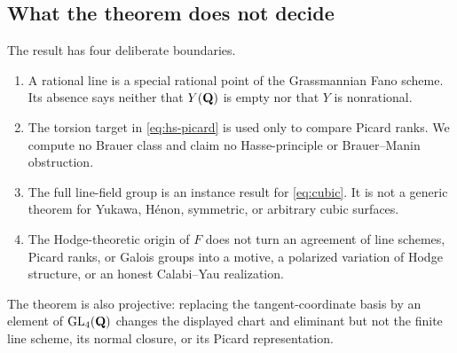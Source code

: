 \subsection{What the theorem does not decide}

The result has four deliberate boundaries.
\begin{enumerate}[leftmargin=*]
\item A rational line is a special rational point of the Grassmannian Fano
scheme.  Its absence says neither that \(Y(\mathbf Q)\) is empty nor that \(Y\) is
nonrational.
\item The torsion target in \cref{eq:hs-picard} is used only to compare
Picard ranks.  We compute no Brauer class and claim no Hasse-principle or
Brauer--Manin obstruction.
\item The full line-field group is an instance result for
\cref{eq:cubic}.  It is not a generic theorem for Yukawa, H\'enon,
symmetric, or arbitrary cubic surfaces.
\item The Hodge-theoretic origin of \(F\) does not turn an agreement of
line schemes, Picard ranks, or Galois groups into a motive, a polarized
variation of Hodge structure, or an honest Calabi--Yau realization.
\end{enumerate}

The theorem is also projective: replacing the tangent-coordinate basis by
an element of \(\operatorname{GL}_4(\mathbf Q)\) changes the displayed chart and
eliminant but not the finite line scheme, its normal closure, or its Picard
representation.
